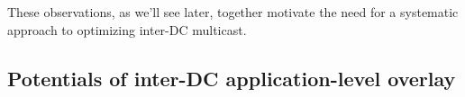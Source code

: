 \vspace{0.1cm}
These observations, as we'll see later, together motivate the need for a systematic approach
to optimizing inter-DC multicast.


%
%
%
%

\subsection{Potentials of inter-DC application-level overlay}
\label{subsec:motivation:case-for}


